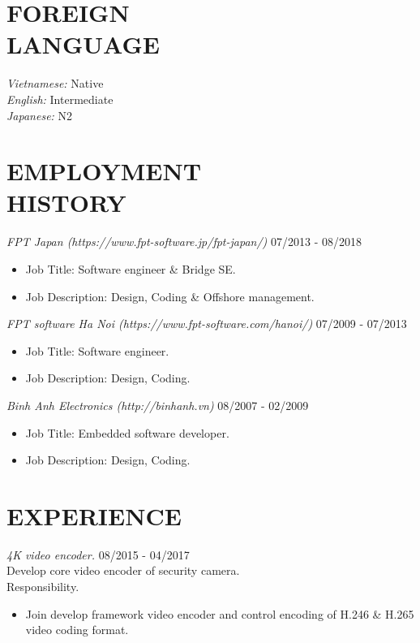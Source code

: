 \documentclass[margin]{res}
\begin{document}
\begin{resume}
\section{FOREIGN \\ LANGUAGE}
         {\sl Vietnamese:} Native  \\
         {\sl English:}  Intermediate\\
         {\sl Japanese:} N2  \\

 
\section{EMPLOYMENT \\ HISTORY}{\sl FPT Japan (https://www.fpt-software.jp/fpt-japan/)}  \hfill 07/2013 - 08/2018
                 \begin{itemize}  \itemsep -2pt  %
                 \item Job Title: Software engineer \& Bridge SE.
		 \item Job Description:  Design, Coding \& Offshore management. 
                 \end{itemize}

		 {\sl FPT software Ha Noi (https://www.fpt-software.com/hanoi/)}  \hfill 07/2009 - 07/2013
                 \begin{itemize}  \itemsep -2pt  %
                 \item Job Title: Software engineer.
		 \item Job Description: Design, Coding.
                 \end{itemize}

		 {\sl Binh Anh Electronics (http://binhanh.vn)}   \hfill 08/2007 - 02/2009
                 \begin{itemize}  \itemsep -2pt  %
		 \item Job Title: Embedded software developer. 
		 \item Job Description: Design, Coding.
                 \end{itemize}
        
\section{EXPERIENCE}
                {\sl 4K video encoder.} \hfill            08/2015 - 04/2017 \\
		 Develop core video encoder of security camera.\\
		 Responsibility.
                 \begin{itemize}  \itemsep -2pt %
                 \item Join develop framework video encoder and control encoding of H.246 \& H.265 video coding format.
                 \end{itemize}


\end{resume}
\end{document}
